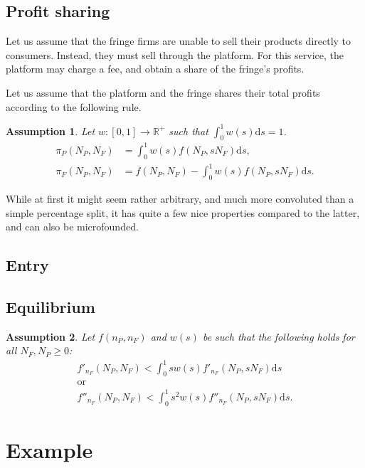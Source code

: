 \documentclass[a4paper]{article}
\newtheorem{assumption}{Assumption}
\newcommand{\ds}{\mathrm{d}s}
\begin{document}
\subsection{Profit sharing}

Let us assume that the fringe firms are unable to sell their products directly to consumers.
Instead, they must sell through the platform.
For this service, the platform may charge a fee, and obtain a share of the fringe's profits.

Let us assume that the platform and the fringe shares their total profits according to the following rule.
\begin{assumption}
    \label{ass:profit_sharing}
    Let $w: [0, 1] \to \mathbb{R}^+$ such that $\int_0^1 w(s) \ds = 1$. 
    \begin{align*}
        \pi_P(N_P, N_F) &= \int_0^1 w(s) f(N_P, s N_F) \ds, \\
        \pi_F(N_P, N_F) &= f(N_P, N_F) - \int_0^1 w(s) f(N_P, s N_F) \ds.
    \end{align*}
\end{assumption}

While at first it might seem rather arbitrary, and much more convoluted than a simple percentage split, it has quite a few nice properties compared to the latter, and can also be microfounded.




\subsection{Entry}


\subsection{Equilibrium}

\begin{assumption}
    \label{ass:single_crossing}
    Let $f(n_P, n_F)$ and $w(s)$ be such that the following holds for all $N_F, N_P \geq 0$:
    \begin{gather*}
        f'_{n_F} (N_P, N_F) < \int_0^1 s w(s) f'_{n_F} (N_P, s N_F) \ds \\
        \text{or} \\
        f''_{n_F} (N_P, N_F) < \int_0^1 s^2 w(s) f''_{n_F} (N_P, s N_F) \ds.
    \end{gather*}
\end{assumption}


\section{Example}
\label{sec:model}
\end{document}
